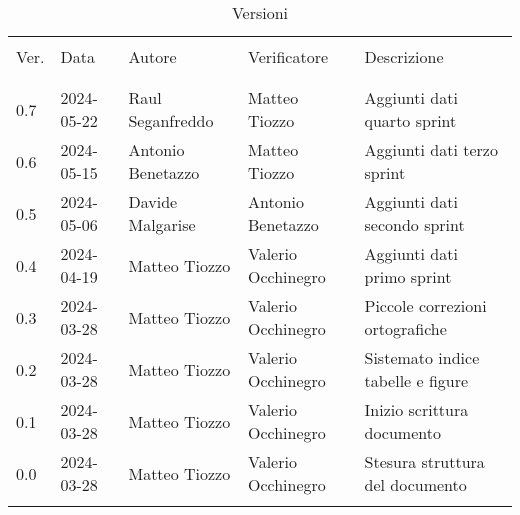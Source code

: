 \documentclass[12pt]{article} %
\begin{document}


\newpage



\begin{table}[!h]
	\footnotesize
	\begin{center}
		\caption*{Versioni}
		\vspace{0.5cm}
		\begin{tabular}{ l l l l p{6cm} }
			\hline                                                                                          \\[-2ex]
			Ver. & Data & Autore & Verificatore & Descrizione \\
			\\[-2ex] \hline \\[-1.5ex]
			0.7 & 2024-05-22 & Raul Seganfreddo & Matteo Tiozzo & Aggiunti dati quarto sprint \\
			0.6 & 2024-05-15 & Antonio Benetazzo & Matteo Tiozzo & Aggiunti dati terzo sprint \\
			0.5 & 2024-05-06 & Davide Malgarise & Antonio Benetazzo  & Aggiunti dati secondo sprint \\
			0.4 & 2024-04-19 & Matteo Tiozzo & Valerio Occhinegro & Aggiunti dati primo sprint \\
			0.3 & 2024-03-28 & Matteo Tiozzo & Valerio Occhinegro & Piccole correzioni ortografiche \\
			0.2 & 2024-03-28 & Matteo Tiozzo & Valerio Occhinegro & Sistemato indice tabelle e figure \\
			0.1 & 2024-03-28 & Matteo Tiozzo & Valerio Occhinegro & Inizio scrittura documento \\
			0.0 & 2024-03-28 & Matteo Tiozzo & Valerio Occhinegro & Stesura struttura del documento \\
			\\[-1.5ex] \hline
		\end{tabular}
	\end{center}
\end{table}

\newpage

\tableofcontents

\newpage

\listoftables

\listoffigures

\newpage



\newpage



\newpage



\newpage



\newpage


\end{document}
